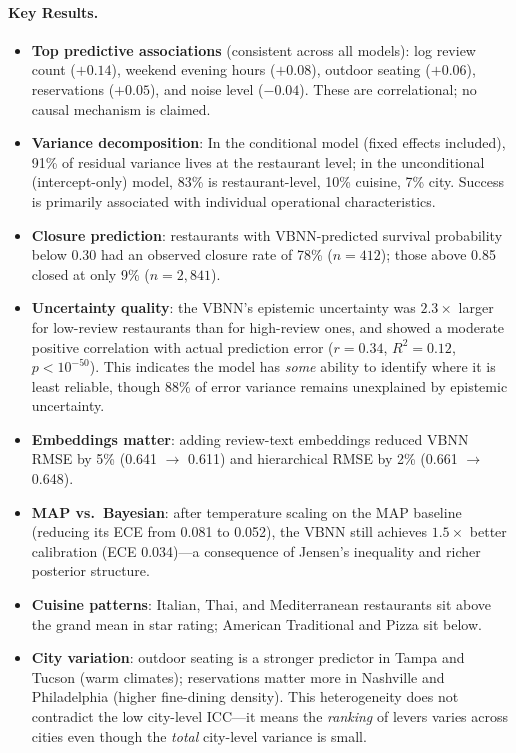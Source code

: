 \documentclass[10pt, letterpaper]{article}
\begin{document}
\paragraph{Key Results.}
\begin{itemize}
  \item \textbf{Top predictive associations} (consistent across all models): log review count ($+0.14$), weekend evening hours ($+0.08$), outdoor seating ($+0.06$), reservations ($+0.05$), and noise level ($-0.04$). These are correlational; no causal mechanism is claimed.
  \item \textbf{Variance decomposition}: In the conditional model (fixed effects included), 91\% of residual variance lives at the restaurant level; in the unconditional (intercept-only) model, 83\% is restaurant-level, 10\% cuisine, 7\% city. Success is primarily associated with individual operational characteristics.
  \item \textbf{Closure prediction}: restaurants with VBNN-predicted survival probability below 0.30 had an observed closure rate of 78\% ($n{=}412$); those above 0.85 closed at only 9\% ($n{=}2{,}841$).
  \item \textbf{Uncertainty quality}: the VBNN's epistemic uncertainty was $2.3\times$ larger for low-review restaurants than for high-review ones, and showed a moderate positive correlation with actual prediction error ($r = 0.34$, $R^2 = 0.12$, $p < 10^{-50}$). This indicates the model has \emph{some} ability to identify where it is least reliable, though 88\% of error variance remains unexplained by epistemic uncertainty.
  \item \textbf{Embeddings matter}: adding review-text embeddings reduced VBNN RMSE by 5\% (0.641 $\to$ 0.611) and hierarchical RMSE by 2\% (0.661 $\to$ 0.648).
  \item \textbf{MAP vs.\ Bayesian}: after temperature scaling on the MAP baseline (reducing its ECE from 0.081 to 0.052), the VBNN still achieves $1.5{\times}$ better calibration (ECE 0.034)---a consequence of Jensen's inequality and richer posterior structure.
  \item \textbf{Cuisine patterns}: Italian, Thai, and Mediterranean restaurants sit above the grand mean in star rating; American Traditional and Pizza sit below.
  \item \textbf{City variation}: outdoor seating is a stronger predictor in Tampa and Tucson (warm climates); reservations matter more in Nashville and Philadelphia (higher fine-dining density). This heterogeneity does not contradict the low city-level ICC---it means the \emph{ranking} of levers varies across cities even though the \emph{total} city-level variance is small.
\end{itemize}
\end{document}
